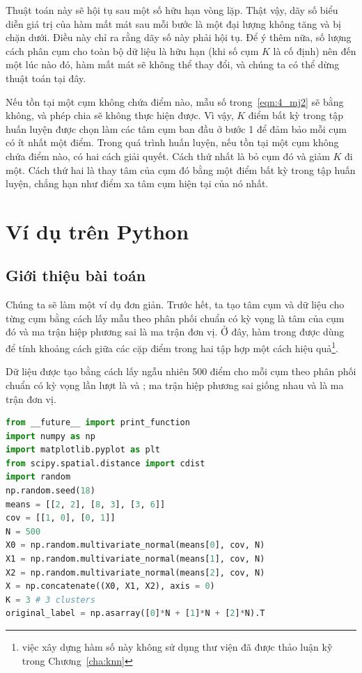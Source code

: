 Thuật toán này sẽ hội tụ sau một số hữu hạn vòng lặp. Thật vậy, dãy số biểu diễn giá trị của hàm mất mát sau mỗi bước là một đại
lượng không tăng và bị chặn dưới. Điều này chỉ ra rằng dãy số này phải hội tụ.
Để ý thêm nữa, số lượng cách phân cụm cho toàn bộ dữ liệu là hữu hạn (khi số
cụm $K$ là cố định) nên đến một lúc nào đó, hàm mất mát sẽ không thể thay
đổi, và chúng ta có thể dừng thuật toán tại đây.

Nếu tồn tại một cụm không chứa điểm nào, mẫu số trong~\eqref{eqn:4_mj2} sẽ
bằng không, và phép chia sẽ không thực hiện được. Vì vậy, $K$ điểm bất kỳ trong
tập huấn luyện được chọn làm các tâm cụm ban đầu ở bước 1 để đảm bảo mỗi
cụm có ít nhất một điểm. Trong quá trình huấn luyện, nếu tồn tại một cụm
không chứa điểm nào, có hai cách giải quyết. Cách thứ nhất là bỏ cụm đó
và giảm $K$ đi một. Cách thứ hai là thay tâm của cụm đó bằng một điểm
bất kỳ trong tập huấn luyện, chẳng hạn như điểm xa tâm cụm hiện tại của nó nhất.

\section{Ví dụ trên Python}


\subsection{Giới thiệu bài toán}
Chúng ta sẽ làm một ví dụ đơn giản. Trước hết, ta tạo tâm cụm và dữ liệu cho
từng cụm bằng cách lấy mẫu theo phân phối chuẩn có kỳ vọng là tâm của
cụm đó và ma trận hiệp phương sai là ma trận đơn vị. Ở đây, hàm
 trong  được dùng để
tính khoảng cách giữa các cặp điểm trong hai tập hợp một cách hiệu
quả\footnote{việc xây dựng hàm số này không sử dụng thư viện đã được thảo luận
kỹ trong Chương~\ref{cha:knn}}.

Dữ liệu được tạo bằng cách lấy ngẫu nhiên 500 điểm cho mỗi cụm theo phân
phối chuẩn có kỳ vọng lần lượt là  và
; ma trận hiệp phương sai giống nhau và là ma trận đơn vị.
\begin{lstlisting}[language=Python]
from __future__ import print_function 
import numpy as np 
import matplotlib.pyplot as plt
from scipy.spatial.distance import cdist
import random
np.random.seed(18)
means = [[2, 2], [8, 3], [3, 6]]
cov = [[1, 0], [0, 1]]
N = 500
X0 = np.random.multivariate_normal(means[0], cov, N)
X1 = np.random.multivariate_normal(means[1], cov, N)
X2 = np.random.multivariate_normal(means[2], cov, N)
X = np.concatenate((X0, X1, X2), axis = 0)
K = 3 # 3 clusters 
original_label = np.asarray([0]*N + [1]*N + [2]*N).T
\end{lstlisting}


